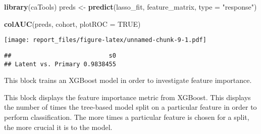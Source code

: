 \documentclass[]{article}
\newenvironment{Shaded}{\begin{snugshade}}{\end{snugshade}}
\newcommand{\KeywordTok}[1]{\textcolor[rgb]{0.13,0.29,0.53}{\textbf{#1}}}
\newcommand{\DataTypeTok}[1]{\textcolor[rgb]{0.13,0.29,0.53}{#1}}
\newcommand{\DecValTok}[1]{\textcolor[rgb]{0.00,0.00,0.81}{#1}}
\newcommand{\StringTok}[1]{\textcolor[rgb]{0.31,0.60,0.02}{#1}}
\newcommand{\OtherTok}[1]{\textcolor[rgb]{0.56,0.35,0.01}{#1}}
\newcommand{\OperatorTok}[1]{\textcolor[rgb]{0.81,0.36,0.00}{\textbf{#1}}}
\newcommand{\NormalTok}[1]{#1}
\begin{document}
\begin{Shaded}
\begin{Highlighting}[]
\KeywordTok{library}\NormalTok{(caTools)}
\NormalTok{preds <-}\StringTok{ }\KeywordTok{predict}\NormalTok{(lasso_fit, feature_matrix, }\DataTypeTok{type =} \StringTok{"response"}\NormalTok{)}

\KeywordTok{colAUC}\NormalTok{(preds, cohort, }\DataTypeTok{plotROC =} \OtherTok{TRUE}\NormalTok{)}
\end{Highlighting}
\end{Shaded}

\texttt{[image: report\_files/figure-latex/unnamed-chunk-9-1.pdf]}

\begin{verbatim}
##                           s0
## Latent vs. Primary 0.9838455
\end{verbatim}

This block trains an XGBoost model in order to investigate feature
importance.

\begin{Shaded}
\end{Shaded}

This block displays the feature importance metric from XGBoost. This
displays the number of times the tree-based model split on a particular
feature in order to perform classification. The more times a particular
feature is chosen for a split, the more crucial it is to the model.
\end{document}
